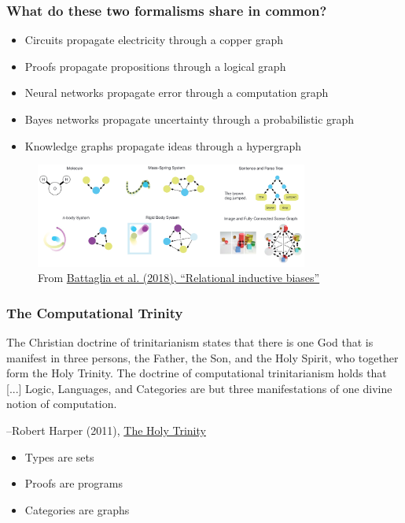 \documentclass{beamer}
\begin{document}
  \begin{frame}
    \frametitle{What do these two formalisms share in common?}
    \begin{itemize}
      \item Circuits propagate electricity through a copper graph
      \item Proofs propagate propositions through a logical graph
      \item Neural networks propagate error through a computation graph
      \item Bayes networks propagate uncertainty through a probabilistic graph
      \item Knowledge graphs propagate ideas through a hypergraph
    \end{itemize}
    \begin{figure}[H]
      \centering
      \includegraphics[width=0.8\textwidth]{../clipart/relational_biases.png}
      \caption{From \href{https://arxiv.org/pdf/1806.01261.pdf}{Battaglia et al. (2018), ``Relational inductive biases''}}
    \end{figure}

  \end{frame}

  \begin{frame}
      \frametitle{The Computational Trinity}
      \setlength{\epigraphwidth}{0.70\textwidth}
      \epigraph{The Christian doctrine of trinitarianism states that there is one God that is manifest in three persons, the Father, the Son, and the Holy Spirit, who together form the Holy Trinity. The doctrine of computational trinitarianism holds that [...] Logic, Languages, and Categories are but three manifestations of one divine notion of computation.}{--Robert Harper (2011), \href{https://existentialtype.wordpress.com/2011/03/27/the-holy-trinity/}{The Holy Trinity}}
      \begin{itemize}
          \item Types are sets
          \item Proofs are programs
          \item Categories are graphs
      \end{itemize}
  \end{frame}
\end{document}
